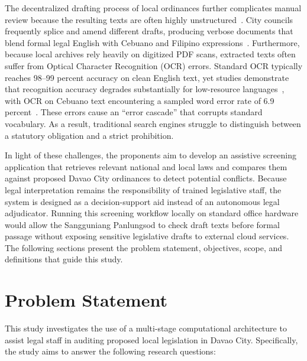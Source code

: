 The decentralized drafting process of local ordinances further complicates manual review because the resulting texts are often highly unstructured~\cite{spdc2022ra00122}. City councils frequently splice and amend different drafts, producing verbose documents that blend formal legal English with Cebuano and Filipino expressions~\cite{dreisbach2021language}. Furthermore, because local archives rely heavily on digitized PDF scans, extracted texts often suffer from Optical Character Recognition (OCR) errors. Standard OCR typically reaches 98--99 percent accuracy on clean English text, yet studies demonstrate that recognition accuracy degrades substantially for low-resource languages~\cite{ignat2022ocr}, with OCR on Cebuano text encountering a sampled word error rate of 6.9 percent~\cite{oard2003desperately}. These errors cause an ``error cascade'' that corrupts standard vocabulary. As a result, traditional search engines struggle to distinguish between a statutory obligation and a strict prohibition.

In light of these challenges, the proponents aim to develop an assistive screening application that retrieves relevant national and local laws and compares them against proposed Davao City ordinances to detect potential conflicts. Because legal interpretation remains the responsibility of trained legislative staff, the system is designed as a decision-support aid instead of an autonomous legal adjudicator. Running this screening workflow locally on standard office hardware would allow the Sangguniang Panlungsod to check draft texts before formal passage without exposing sensitive legislative drafts to external cloud services. The following sections present the problem statement, objectives, scope, and definitions that guide this study.


\section{Problem Statement}
This study investigates the use of a multi-stage computational architecture to assist legal staff in auditing proposed local legislation in Davao City. Specifically, the study aims to answer the following research questions:

